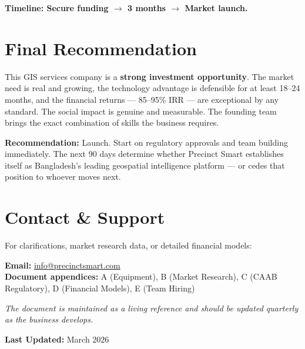 \textbf{Timeline: Secure funding $\rightarrow$ 3 months $\rightarrow$ Market launch.}

\section{Final Recommendation}

This GIS services company is a \textcolor{AccentGreen}{\textbf{strong investment opportunity}}. The market need is real and growing, the technology advantage is defensible for at least 18--24 months, and the financial returns --- 85--95\% IRR --- are exceptional by any standard. The social impact is genuine and measurable. The founding team brings the exact combination of skills the business requires.

\textcolor{SecondaryBlue}{\textbf{Recommendation:}} Launch. Start on regulatory approvals and team building immediately. The next 90 days determine whether Precinct Smart establishes itself as Bangladesh's leading geospatial intelligence platform --- or cedes that position to whoever moves next.

\section{Contact \& Support}

For clarifications, market research data, or detailed financial models:

\begin{infobox}
    \textbf{Email:} \href{mailto:info@precinctsmart.com}{\textcolor{SecondaryBlue}{info@precinctsmart.com}}\\
    \textbf{Document appendices:} A (Equipment), B (Market Research), C (CAAB Regulatory), D (Financial Models), E (Team Hiring)
\end{infobox}

\textit{The document is maintained as a living reference and should be updated quarterly as the business develops.}

\textbf{Last Updated:} March 2026

